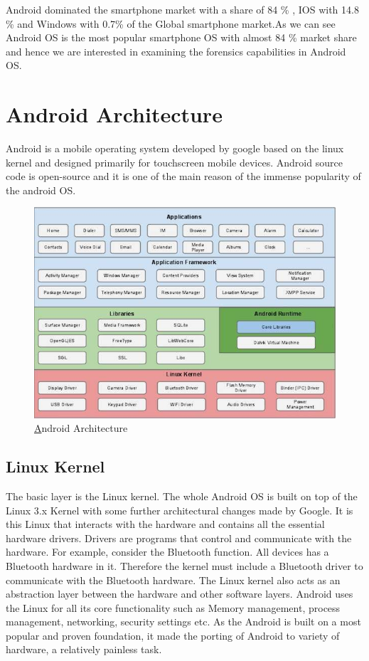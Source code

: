 Android dominated the smartphone market with a share of 84 \% , IOS with 14.8 \% and Windows with 0.7\% of the Global smartphone market.As we can see Android OS is the most popular smartphone OS with almost 84 \% market share and hence we  are interested in examining the forensics capabilities in Android OS. 
\goodbreak
\section{Android Architecture}
Android is a mobile operating system developed by google based on the linux kernel and designed primarily for touchscreen mobile devices. Android source code is open-source and it is one of the main reason of the immense popularity of the android OS.
\begin{figure}
   \vspace*{-1cm}
    \includegraphics[height=0.5\textheight]{fig01/architecture}
    \caption{\href {https://www.tutorialspoint.com/android/images/architecture.jpg}Android Architecture} \label{Android Architecture}
    
  \end{figure}


\subsection{Linux Kernel}
The basic layer is the Linux kernel. The whole Android OS is built on top of the Linux 3.x Kernel with some further architectural changes made by Google. It is this Linux that interacts with the hardware and contains all the essential hardware drivers. Drivers are programs that control and communicate with the hardware. For example, consider the Bluetooth function. All devices has a Bluetooth hardware in it. Therefore the kernel must include a Bluetooth driver to communicate with the Bluetooth hardware. The Linux kernel also acts as an abstraction layer between the hardware and other software layers. Android uses the Linux for all its core functionality such as Memory management, process management, networking, security settings etc. As the Android is built on a most popular and proven foundation, it made the porting of Android to variety of hardware, a relatively painless task.


